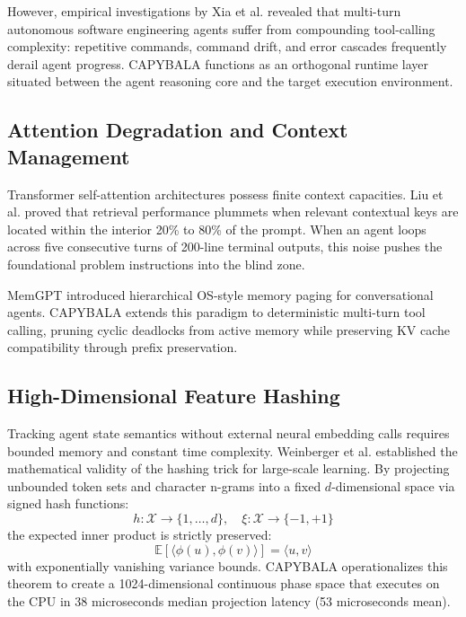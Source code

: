 \documentclass[journal]{IEEEtran}
\begin{document}
However, empirical investigations by Xia et al. \cite{xia2025demystifying} revealed that multi-turn autonomous software engineering agents suffer from compounding tool-calling complexity: repetitive commands, command drift, and error cascades frequently derail agent progress. CAPYBALA functions as an orthogonal runtime layer situated between the agent reasoning core and the target execution environment.

\subsection{Attention Degradation and Context Management}
Transformer self-attention architectures \cite{vaswani2017attention} possess finite context capacities. Liu et al. \cite{liu2024lost} proved that retrieval performance plummets when relevant contextual keys are located within the interior 20\% to 80\% of the prompt. When an agent loops across five consecutive turns of 200-line terminal outputs, this noise pushes the foundational problem instructions into the blind zone.

MemGPT \cite{packer2023memgpt} introduced hierarchical OS-style memory paging for conversational agents. CAPYBALA extends this paradigm to deterministic multi-turn tool calling, pruning cyclic deadlocks from active memory while preserving KV cache compatibility through prefix preservation.

\subsection{High-Dimensional Feature Hashing}
Tracking agent state semantics without external neural embedding calls requires bounded memory and constant time complexity. Weinberger et al. \cite{weinberger2009feature} established the mathematical validity of the hashing trick for large-scale learning. By projecting unbounded token sets and character n-grams into a fixed $d$-dimensional space via signed hash functions:
\begin{equation}
h: \mathcal{X} \to \{1, \dots, d\}, \quad \xi: \mathcal{X} \to \{-1, +1\}
\end{equation}
the expected inner product is strictly preserved:
\begin{equation}
\mathbb{E}[\langle \phi(u), \phi(v) \rangle] = \langle u, v \rangle
\end{equation}
with exponentially vanishing variance bounds. CAPYBALA operationalizes this theorem to create a 1024-dimensional continuous phase space that executes on the CPU in 38 microseconds median projection latency (53 microseconds mean).
\end{document}
